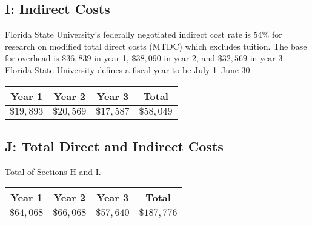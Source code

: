 \documentclass[11pt]{article}
\begin{document}
\subsection*{I: Indirect Costs}
Florida State University's federally negotiated indirect cost rate is
54\% for research on modified total direct costs (MTDC) which excludes
tuition. The base for overhead is $\$36,839$ in year 1, $\$38,090$ in
year 2, and $\$32,569$ in year 3. Florida State University defines a
fiscal year to be July 1--June 30.
\begin{center}
  \begin{tabular}{|c|c|c|c|}
    \hline
    Year 1 & Year 2 & Year 3 & Total \\
    \hline
    $\$19,893$ & $\$20,569$ & $\$17,587$ & $\$58,049$ \\
    \hline
  \end{tabular}
\end{center}


\subsection*{J: Total Direct and Indirect Costs}
Total of Sections H and I.
\begin{center}
  \begin{tabular}{|c|c|c|c|}
    \hline
    Year 1 & Year 2 & Year 3 & Total \\
    \hline
    $\$64,068$ & $\$66,068$ & $\$57,640$ & $\$187,776$ \\
    \hline
  \end{tabular}
\end{center}
\end{document}
